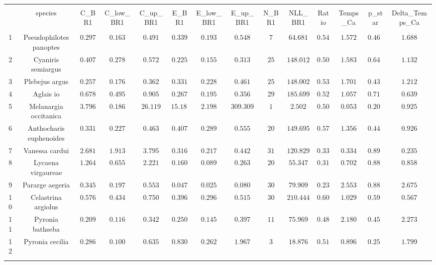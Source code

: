 
\begin{table}[!htbp] \centering 
  \caption{} 
  \label{} 
\begin{tabular}{@{\extracolsep{5pt}} cccccccccccccc} 
\\[-1.8ex]\hline 
\hline \\[-1.8ex] 
 & species & C\_BR1 & C\_low\_BR1 & C\_up\_BR1 & E\_BR1 & E\_low\_BR1 & E\_up\_BR1 & N\_BR1 & NLL\_BR1 & Ratio & Temps\_Ca & p\_star & Delta\_Temps\_Ca \\ 
\hline \\[-1.8ex] 
1 & Pseudophilotes panoptes & $0.297$ & $0.163$ & $0.491$ & $0.339$ & $0.193$ & $0.548$ & $7$ & $64.681$ & $0.548$ & $1.572$ & $0.468$ & $1.688$ \\ 
2 & Cyaniris semiargus & $0.407$ & $0.278$ & $0.572$ & $0.225$ & $0.155$ & $0.313$ & $25$ & $148.012$ & $0.509$ & $1.583$ & $0.644$ & $1.132$ \\ 
3 & Plebejus argus & $0.257$ & $0.176$ & $0.362$ & $0.331$ & $0.228$ & $0.461$ & $25$ & $148.002$ & $0.530$ & $1.701$ & $0.437$ & $1.212$ \\ 
4 & Aglais io & $0.678$ & $0.495$ & $0.905$ & $0.267$ & $0.195$ & $0.356$ & $29$ & $185.699$ & $0.526$ & $1.057$ & $0.717$ & $0.639$ \\ 
5 & Melanargia occitanica & $3.796$ & $0.186$ & $26.119$ & $15.180$ & $2.198$ & $309.309$ & $1$ & $2.502$ & $0.500$ & $0.053$ & $0.200$ & $0.925$ \\ 
6 & Anthocharis euphenoides & $0.331$ & $0.227$ & $0.463$ & $0.407$ & $0.289$ & $0.555$ & $20$ & $149.695$ & $0.576$ & $1.356$ & $0.448$ & $0.926$ \\ 
7 & Vanessa cardui & $2.681$ & $1.913$ & $3.795$ & $0.316$ & $0.217$ & $0.442$ & $31$ & $120.829$ & $0.337$ & $0.334$ & $0.895$ & $0.235$ \\ 
8 & Lycaena virgaureae & $1.264$ & $0.655$ & $2.221$ & $0.160$ & $0.089$ & $0.263$ & $20$ & $55.347$ & $0.316$ & $0.702$ & $0.888$ & $0.858$ \\ 
9 & Pararge aegeria & $0.345$ & $0.197$ & $0.553$ & $0.047$ & $0.025$ & $0.080$ & $30$ & $79.909$ & $0.230$ & $2.553$ & $0.880$ & $2.675$ \\ 
10 & Celastrina argiolus & $0.576$ & $0.434$ & $0.750$ & $0.396$ & $0.296$ & $0.515$ & $30$ & $210.444$ & $0.605$ & $1.029$ & $0.593$ & $0.567$ \\ 
11 & Pyronia bathseba & $0.209$ & $0.116$ & $0.342$ & $0.250$ & $0.145$ & $0.397$ & $11$ & $75.969$ & $0.481$ & $2.180$ & $0.455$ & $2.273$ \\ 
12 & Pyronia cecilia & $0.286$ & $0.100$ & $0.635$ & $0.830$ & $0.262$ & $1.967$ & $3$ & $18.876$ & $0.510$ & $0.896$ & $0.256$ & $1.799$ \\ 
\hline \\[-1.8ex] 
\end{tabular} 
\end{table} 
